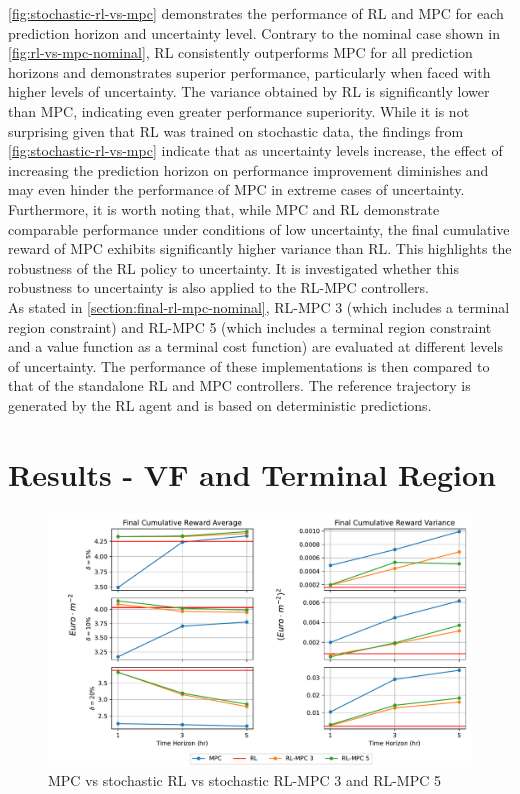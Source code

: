 \autoref{fig:stochastic-rl-vs-mpc} demonstrates the performance of RL and MPC for each prediction horizon and uncertainty level. Contrary to the nominal case shown in \ref{fig:rl-vs-mpc-nominal}, RL consistently outperforms MPC for all prediction horizons and demonstrates superior performance, particularly when faced with higher levels of uncertainty. The variance obtained by RL is significantly lower than MPC, indicating even greater performance superiority. While it is not surprising given that RL was trained on stochastic data, the findings from \autoref{fig:stochastic-rl-vs-mpc} indicate that as uncertainty levels increase, the effect of increasing the prediction horizon on performance improvement diminishes and may even hinder the performance of MPC in extreme cases of uncertainty. Furthermore, it is worth noting that, while MPC and RL demonstrate comparable performance under conditions of low uncertainty, the final cumulative reward of MPC exhibits significantly higher variance than RL. This highlights the robustness of the RL policy to uncertainty. It is investigated whether this robustness to uncertainty is also applied to the RL-MPC controllers.\\
As stated in \autoref{section:final-rl-mpc-nominal}, RL-MPC 3 (which includes a terminal region constraint) and RL-MPC 5 (which includes a terminal region constraint and a value function as a terminal cost function) are evaluated at different levels of uncertainty. The performance of these implementations is then compared to that of the standalone RL and MPC controllers. The reference trajectory is generated by the RL agent and is based on deterministic predictions.

\section{Results - VF and Terminal Region}


\begin{figure}[H]
	\centering
	\includegraphics[width=\textwidth]{figures/stochastic_rl_vs_mpc_impl3.pdf}
	\caption{MPC vs stochastic RL vs stochastic RL-MPC 3 and RL-MPC 5}
	\label{fig:stochastic-mpv-vs-rl-rlmpc3-vs-rlmpc5}
\end{figure}

